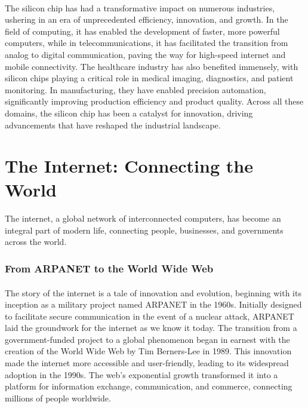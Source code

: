 \documentclass[a4paper,12pt]{book}
\begin{document}
\paragraph{}
The silicon chip has had a transformative impact on numerous industries, ushering in an era of unprecedented efficiency, innovation, and growth. In the field of computing, it has enabled the development of faster, more powerful computers, while in telecommunications, it has facilitated the transition from analog to digital communication, paving the way for high-speed internet and mobile connectivity. The healthcare industry has also benefited immensely, with silicon chips playing a critical role in medical imaging, diagnostics, and patient monitoring. In manufacturing, they have enabled precision automation, significantly improving production efficiency and product quality. Across all these domains, the silicon chip has been a catalyst for innovation, driving advancements that have reshaped the industrial landscape.

\section*{The Internet: Connecting the World}
\paragraph{}
The internet, a global network of interconnected computers, has become an integral part of modern life, connecting people, businesses, and governments across the world.

\subsubsection*{From ARPANET to the World Wide Web}
\paragraph{}
The story of the internet is a tale of innovation and evolution, beginning with its inception as a military project named ARPANET in the 1960s. Initially designed to facilitate secure communication in the event of a nuclear attack, ARPANET laid the groundwork for the internet as we know it today. The transition from a government-funded project to a global phenomenon began in earnest with the creation of the World Wide Web by Tim Berners-Lee in 1989. This innovation made the internet more accessible and user-friendly, leading to its widespread adoption in the 1990s. The web's exponential growth transformed it into a platform for information exchange, communication, and commerce, connecting millions of people worldwide.
\end{document}
